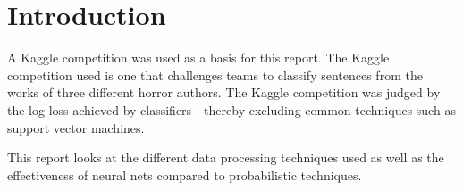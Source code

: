 \section{Introduction}
\label{sec:intro}
A Kaggle competition was used as a basis for this report. The Kaggle competition
used is one that challenges teams to classify sentences from the works of three
different horror authors. The Kaggle competition was judged by the log-loss
achieved by classifiers - thereby excluding common techniques such as support
vector machines. 

This report looks at the different data processing techniques used as well as the effectiveness of neural nets compared to probabilistic techniques.